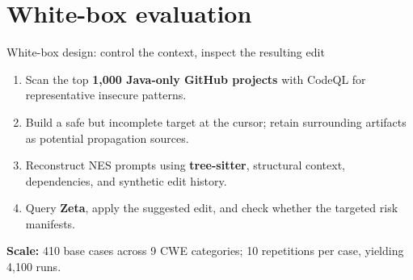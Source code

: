 \section{White-box evaluation}
\begin{frame}{White-box design: control the context, inspect the resulting edit}
\begin{enumerate}
\item Scan the top \textbf{1,000 Java-only GitHub projects} with CodeQL for representative insecure patterns.
\item Build a safe but incomplete target at the cursor; retain surrounding artifacts as potential propagation sources.
\item Reconstruct NES prompts using \textbf{tree-sitter}, structural context, dependencies, and synthetic edit history.
\item Query \textbf{Zeta}, apply the suggested edit, and check whether the targeted risk manifests.
\end{enumerate}
\medskip
\textbf{Scale:} 410 base cases across 9 CWE categories; 10 repetitions per case, yielding 4,100 runs.
\end{frame}

